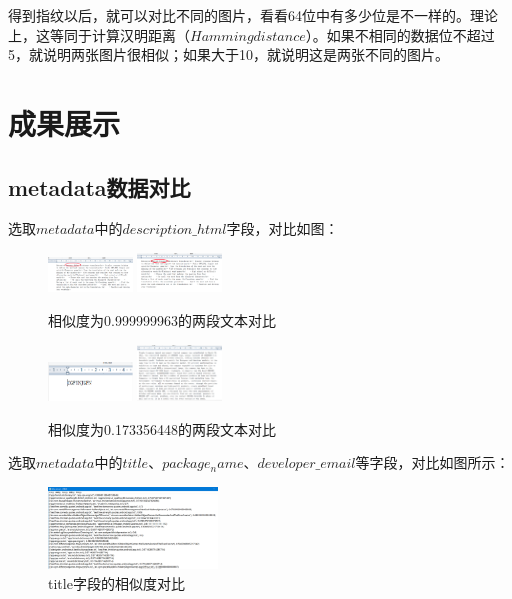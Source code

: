 \documentclass[UTF8,a4paper,10pt, twocolumn]{ctexart}
\begin{document}
得到指纹以后，就可以对比不同的图片，看看64位中有多少位是不一样的。理论上，这等同于计算汉明距离（$Hamming distance$）。如果不相同的数据位不超过5，就说明两张图片很相似；如果大于10，就说明这是两张不同的图片。

\section{成果展示}
\subsection{metadata数据对比}
选取$metadata$中的$description\_html$字段，对比如图：

\begin{figure}[htbp]
\centering
\includegraphics[width=0.2\textwidth]{img/fig1.png}
\includegraphics[width=0.2\textwidth]{img/fig2.png}
\caption{相似度为0.999999963的两段文本对比}
\label{figure:zju1}
\end{figure}

\begin{figure}[htbp]
  \centering
  \includegraphics[width=0.2\textwidth]{img/fig3.png}
  \includegraphics[width=0.2\textwidth]{img/fig4.png}
  \caption{相似度为0.173356448的两段文本对比}
  \label{figure:zju2}
  \end{figure}

选取$metadata$中的$title$、$package_name$、$developer\_email$等字段，对比如图所示：

\begin{figure}[htbp]
  \centering
  \includegraphics[width=0.4\textwidth]{img/fig5.png}
  \caption{title字段的相似度对比}
  \label{figure:zju3}
  \end{figure}
\end{document}
